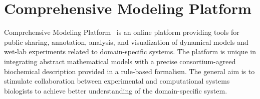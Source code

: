 \documentclass[12pt]{fithesis2}
\begin{document}
\section{Comprehensive Modeling Platform}
\label{cmp}

Comprehensive Modeling Platform~\cite{cs2bio2013} is an online platform providing tools for public sharing, annotation, analysis, and visualization of dynamical models and wet-lab experiments related to domain-specific systems. The platform is unique in integrating abstract mathematical models with a precise consortium-agreed biochemical description provided in a rule-based formalism. The general aim is to stimulate collaboration between experimental and computational systems biologists to achieve better understanding of the domain-specific system.

\begin{figure}[!h]
\begin{center}
\end{center}
\end{figure}
\end{document}
